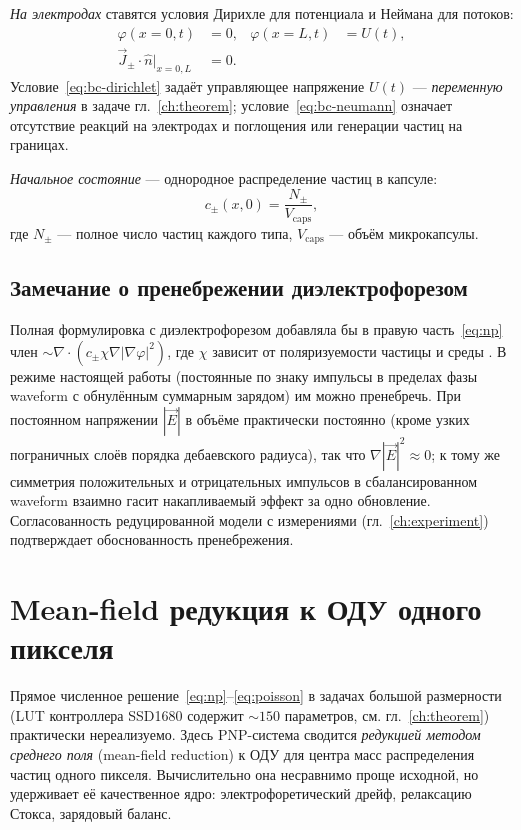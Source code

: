 \textit{На электродах} ставятся условия Дирихле для потенциала и Неймана для
потоков:
\begin{align}
    \varphi(x = 0, t) &= 0,
    & \varphi(x = L, t) &= U(t), \label{eq:bc-dirichlet} \\
    \vec{J}_\pm \cdot \hat{n} \big|_{x=0,L} &= 0. \label{eq:bc-neumann}
\end{align}
Условие~\eqref{eq:bc-dirichlet} задаёт управляющее напряжение $U(t)$ —
\emph{переменную управления} в задаче гл.~\ref{ch:theorem};
условие~\eqref{eq:bc-neumann} означает отсутствие реакций на электродах и
поглощения или генерации частиц на границах.

\textit{Начальное состояние} — однородное распределение частиц в капсуле:
\begin{equation}
    c_\pm(x, 0) = \frac{N_\pm}{V_{\mathrm{caps}}},
    \label{eq:ic}
\end{equation}
где $N_\pm$ — полное число частиц каждого типа, $V_{\mathrm{caps}}$ — объём
микрокапсулы.

\subsection*{Замечание о пренебрежении диэлектрофорезом}

Полная формулировка с диэлектрофорезом добавляла бы в правую
часть~\eqref{eq:np} член $\sim \nabla \cdot \left(c_\pm \chi \nabla |\nabla\varphi|^2\right)$,
где $\chi$ зависит от поляризуемости частицы и среды \cite{bert2003_physics}.
В режиме настоящей работы (постоянные по знаку импульсы в пределах фазы
waveform с обнулённым суммарным зарядом) им можно пренебречь. При постоянном
напряжении $|\vec{E}|$ в объёме практически постоянно (кроме узких пограничных
слоёв порядка дебаевского радиуса), так что $\nabla |\vec{E}|^2 \approx 0$;
к тому же симметрия положительных и отрицательных импульсов в сбалансированном
waveform взаимно гасит накапливаемый эффект за одно обновление. Согласованность
редуцированной модели с измерениями (гл.~\ref{ch:experiment}) подтверждает
обоснованность пренебрежения.


\section{Mean-field редукция к ОДУ одного пикселя}\label{sec:model-ode}

Прямое численное решение~\eqref{eq:np}--\eqref{eq:poisson} в задачах большой
размерности (LUT контроллера SSD1680 содержит $\sim 150$
параметров, см. гл.~\ref{ch:theorem}) практически нереализуемо. Здесь
PNP-система сводится \emph{редукцией методом среднего поля} (mean-field
reduction) к ОДУ для центра масс распределения частиц одного пикселя.
Вычислительно она несравнимо проще исходной, но удерживает её качественное
ядро: электрофоретический дрейф, релаксацию Стокса, зарядовый баланс.

